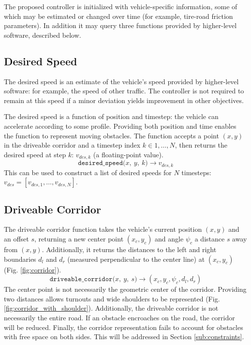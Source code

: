 \documentclass[letterpaper, 10 pt, conference]{ieeeconf}  %
\begin{document}
The proposed controller is initialized with vehicle-specific information, some of which may be estimated or changed over time (for example, tire-road friction parameters). In addition it may query three functions provided by higher-level software, described below.

\subsection{Desired Speed}
The desired speed is an estimate of the vehicle's speed provided by higher-level software: for example, the speed of other traffic. The controller is not required to remain at this speed if a minor deviation yields improvement in other objectives.

The desired speed is a function of position and timestep: the vehicle can accelerate according to some profile. Providing both position and time enables the function to represent moving obstacles.
The function accepts a point $(x, y)$ in the driveable corridor and a timestep index $k \in 1,\dots,N$, then returns the desired speed at step $k$: $v_{des,k}$ (a floating-point value).
%
$$\texttt{desired\_speed($x,\ y,\ k$)}\rightarrow v_{des,k}$$
This can be used to construct a list of desired speeds for $N$ timesteps: $v_{des} = [v_{des,1},\dots,v_{des,N}]$.



\subsection{Driveable Corridor} \label{sub:corridor}

The driveable corridor function takes the vehicle's current position $(x,y)$ and an offset $s$, returning a new center point $(x_c, y_c)$ and angle $\psi_c$ a distance $s$ away from $(x,y)$. Additionally, it returns the distances to the left and right boundaries $d_l$ and $d_r$ (measured perpendicular to the center line) at $(x_c, y_c)$ (Fig. \ref{fig:corridor}).
%
$$\texttt{driveable\_corridor($x,\ y,\ s$)} \rightarrow (x_c, y_c, \psi_c, d_l, d_r)$$
%
The center point is not necessarily the geometric center of the corridor. Providing two distances allows turnouts and wide shoulders to be represented (Fig. \ref{fig:corridor_with_shoulder}). 
Additionally, the driveable corridor is not necessarily the entire road. If an obstacle encroaches on the road, the corridor will be reduced.
Finally, the corridor representation fails to account for obstacles with free space on both sides. This will be addressed in Section \ref{sub:constraints}.
\end{document}

